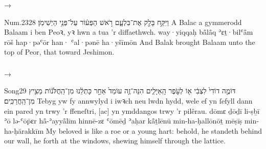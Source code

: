 \begin{frame}{\ex {} → }
	\begin{example}{Num.}{23}{28}{}{}
		\quoling
		{וַיִּקַּ֥ח בָּלָ֖ק אֶת־בִּלְעָ֑ם רֹ֣אשׁ הַפְּע֔וֹר  עַל־פְּנֵ֥י הַיְשִׁימֹֽן׃}
		{A Balac a gymmerodd Balaam i ben Peoꝛ, yꝛ hwn a  tua ’r diffaethwch.}
		{way·yiqqaḥ bå̄lå̄q ʾɛṯ·bilʿå̄m rōš hap·pəʿōr han· ʿal·pənē ha·yšīmōn}
		{And Balak brought Balaam unto the top of Peor, that  toward Jeshimon.}
	\end{example}
\end{frame}






\subsubsection{}

\begin{frame}{\ex {} → }
	\begin{example}{Song}{2}{9}{}{}
		\quoling
		{דּוֹמֶ֤ה דוֹדִי֙ לִצְבִ֔י א֖וֹ לְעֹ֣פֶר הָֽאַיָּלִ֑ים הִנֵּה־זֶ֤ה עוֹמֵד֙ אַחַ֣ר כָּתְלֵ֔נוּ  מִן־הַֽחֲלֹּנ֔וֹת מֵצִ֖יץ מִן־הַֽחֲרַכִּֽים׃}
		{Tebyg yw fy annwylyd i iwꝛch neu lwdn hydd, wele ef yn ſefyll dann ein pared yn  trwy ’r ffeneſtri, [ac] yn ymddangos trwy ’r pilêrau.}
		{dōmɛ ḏōḏī li-ṣḇī ʾō lə-ʿōp̄ɛr hå̄-ʾayyå̄līm hinnē-zɛ ʿōmēḏ ʾaḥar kå̄ṯlēnū  min-ha-ḥallōnōṯ mēṣīṣ min-ha-ḥărakkīm}
		{My beloved is like a roe or a young hart: behold, he standeth behind our wall, he  forth at the windows, shewing himself through the lattice.}
	\end{example}
\end{frame}



\subsubsection{}

